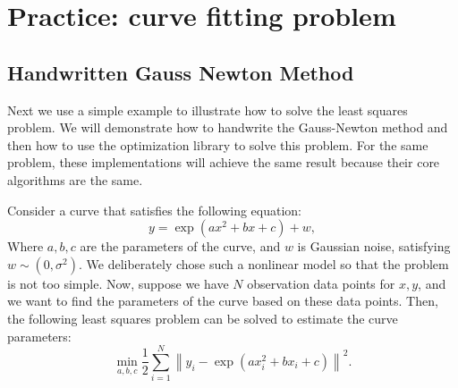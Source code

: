 \section{Practice: curve fitting problem}
\subsection{Handwritten Gauss Newton Method}
Next we use a simple example to illustrate how to solve the least squares problem. We will demonstrate how to handwrite the Gauss-Newton method and then how to use the optimization library to solve this problem. For the same problem, these implementations will achieve the same result because their core algorithms are the same.

Consider a curve that satisfies the following equation:
\[
y = \exp( ax^2 + bx + c ) + w,
\]
Where $a,b,c$ are the parameters of the curve, and $w$ is Gaussian noise, satisfying $w \sim (0, \sigma^2)$. We deliberately chose such a nonlinear model so that the problem is not too simple. Now, suppose we have $N$ observation data points for $x,y$, and we want to find the parameters of the curve based on these data points. Then, the following least squares problem can be solved to estimate the curve parameters:
\begin{equation}
\min \limits_{a,b,c} \frac{1}{2}\sum\limits_{i = 1}^N {{{\left\| {{y_i} - \exp \left( {ax_i^ 2 + bx_i + c} \right)} \right\|}^2}} .
\end{equation}

